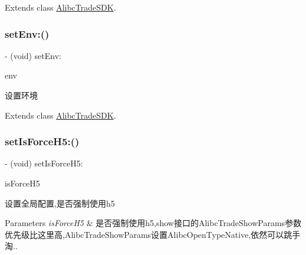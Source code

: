 Extends class \mbox{\hyperlink{interface_alibc_trade_s_d_k_ab52eb7ebf4462b6f44f3441df9c75e03}{Alibc\+Trade\+S\+DK}}.

\mbox{\label{category_alibc_trade_s_d_k_07_settings_08_a08d8381b1c9bef18ff5ee50ced4747b4}} 
\subsubsection{\texorpdfstring{set\+Env\+:()}{setEnv:()}}
{\footnotesize\ttfamily -\/ (void) set\+Env\+: \begin{DoxyParamCaption}\item[{(Alibc\+Environment)}]{env }\end{DoxyParamCaption}}

设置环境 

Extends class \mbox{\hyperlink{interface_alibc_trade_s_d_k_a08d8381b1c9bef18ff5ee50ced4747b4}{Alibc\+Trade\+S\+DK}}.

\mbox{\label{category_alibc_trade_s_d_k_07_settings_08_aa0905a77885d33d44762a552acdcef2d}} 
\subsubsection{\texorpdfstring{set\+Is\+Force\+H5\+:()}{setIsForceH5:()}}
{\footnotesize\ttfamily -\/ (void) set\+Is\+Force\+H5\+: \begin{DoxyParamCaption}\item[{(B\+O\+OL)}]{is\+Force\+H5 }\end{DoxyParamCaption}}

设置全局配置,是否强制使用h5


\begin{DoxyParams}{Parameters}
{\em is\+Force\+H5} & 是否强制使用h5,show接口的\+Alibc\+Trade\+Show\+Params参数优先级比这里高,Alibc\+Trade\+Show\+Params设置\+Alibc\+Open\+Type\+Native,依然可以跳手淘.. \\
\hline
\end{DoxyParams}


